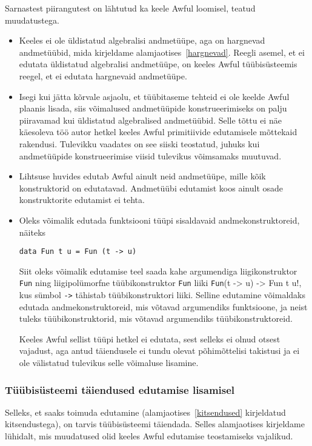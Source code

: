 \documentclass[12pt]{article}
\begin{document}
        Sarnastest piirangutest on lähtutud ka keele Awful loomisel, teatud muudatustega.

        \begin{itemize}
          \item
            Keeles ei ole üldistatud algebralisi andmetüüpe, aga on hargnevad andmetüübid, mida kirjeldame alamjaotises~\ref{hargnevad}. Reegli asemel, et ei edutata üldistatud algebralisi andmetüüpe, on keeles Awful tüübisüsteemis reegel, et ei edutata hargnevaid andmetüüpe.
          \item
            Isegi kui jätta kõrvale asjaolu, et tüübitaseme tehteid ei ole keelde Awful plaanis lisada, siis võimalused andmetüüpide konstrueerimiseks on palju piiravamad kui üldistatud algebralised andmetüübid. Selle tõttu ei näe käesoleva töö autor hetkel keeles Awful primitiivide edutamisele mõttekaid rakendusi. Tulevikku vaadates on see siiski teostatud, juhuks kui andmetüüpide konstrueerimise viisid tulevikus võimsamaks muutuvad.
          \item
            Lihtsuse huvides edutab Awful ainult neid andmetüüpe, mille kõik konstruktorid on edutatavad. Andmetüübi edutamist koos ainult osade konstruktorite edutamist ei tehta.
          \item
            Oleks võimalik edutada funktsiooni tüüpi sisaldavaid andmekonstruktoreid, näiteks

            \begin{verbatim}data Fun t u = Fun (t -> u)\end{verbatim}

            Siit oleks võimalik edutamise teel saada kahe argumendiga liigikonstruktor \verb!Fun! ning liigipolümorfne tüübikonstruktor \verb!Fun! liiki \verb!Fun!(t -> u) -> Fun t u!, kus sümbol \verb!->! tähistab tüübikonstruktori liiki. Selline edutamine võimaldaks edutada andmekonstruktoreid, mis võtavad argumendiks funktsioone, ja neist tuleks tüübikonstruktorid, mis võtavad argumendiks tüübikonstruktoreid.

            Keeles Awful sellist tüüpi hetkel ei edutata, sest selleks ei olnud otsest vajadust, aga antud täiendusele ei tundu olevat põhimõttelisi takistusi ja ei ole välistatud tulevikus selle võimaluse lisamine.
        \end{itemize}
      \subsubsection{Tüübisüsteemi täiendused edutamise lisamisel}
        Selleks, et saaks toimuda edutamine (alamjaotises~\ref{kitsendused} kirjeldatud kitsendustega), on tarvis tüübisüsteemi täiendada. Selles alamjaotises kirjeldame lühidalt, mis muudatused olid keeles Awful edutamise teostamiseks vajalikud.
\end{document}
